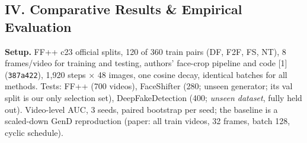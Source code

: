 \documentclass[8pt,a4paper]{article}
\begin{document}
\subsection*{IV. Comparative Results \& Empirical Evaluation}
\textbf{Setup.} FF++ c23 official splits, 120 of 360 train pairs (DF, F2F, FS, NT), 8 frames/video for training and testing, authors' face-crop pipeline and code [1] (\texttt{387a422}), 1,920 steps $\times$ 48 images, one cosine decay, identical batches for all methods. Tests: FF++ (700 videos), FaceShifter (280; unseen generator; its val split is our only selection set), DeepFakeDetection (400; \emph{unseen dataset}, fully held out). Video-level AUC, 3 seeds, paired bootstrap per seed; the baseline is a scaled-down GenD reproduction (paper: all train videos, 32 frames, batch 128, cyclic schedule).
\end{document}
